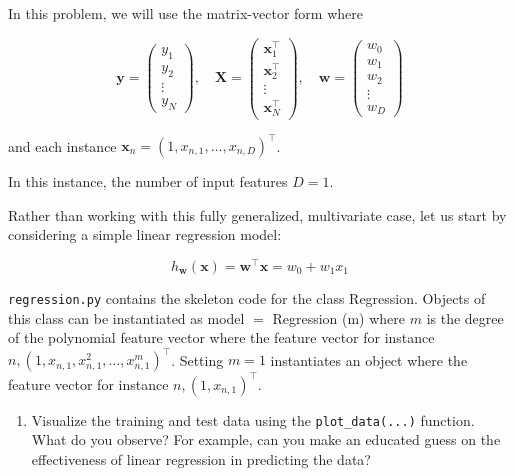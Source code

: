 \documentclass[letterpaper]{article}
\theoremstyle{definition}
\begin{document}
\begin{enumerate}
In this problem, we will use the matrix-vector form where

$$
   \mathbf{y}=\left(\begin{array}{c}
   y_{1} \\
   y_{2} \\
   \vdots \\
   y_{N}
   \end{array}\right), \quad \boldsymbol{X}=\left(\begin{array}{c}
   \mathbf{x}_{1}^{\top} \\
   \mathbf{x}_{2}^{\top} \\
   \vdots \\
   \mathbf{x}_{N}^{\top}
   \end{array}\right), \quad \mathbf{w}=\left(\begin{array}{c}
   w_{0} \\
   w_{1} \\
   w_{2} \\
   \vdots \\
   w_{D}
   \end{array}\right)
   $$

and each instance \(\mathbf{x}_{n}=\left(1, x_{n, 1}, \ldots, x_{n, D}\right)^{\top}\).

In this instance, the number of input features \(D=1\).

Rather than working with this fully generalized, multivariate case, let us start by considering a simple linear regression model:

$$h_{\mathbf{w}}(\mathbf{x})=\mathbf{w}^{\top} \mathbf{x}=w_{0}+w_{1} x_{1}$$

\texttt{regression.py} contains the skeleton code for the class Regression.
Objects of this class can be instantiated as model \(=\) Regression (m)
where \(m\) is the degree of the polynomial feature vector where the feature vector for instance
\(n,\left(1, x_{n, 1}, x_{n, 1}^{2}, \ldots, x_{n, 1}^{m}\right)^{\top}\). Setting \(m=1\)
instantiates an object where the feature vector for instance
\(n,\left(1, x_{n, 1}\right)^{\top}\).

\begin{enumerate}
\item Visualize the training and test data using the \texttt{plot\_data(...)} function.
What do you observe? For example, can you make an educated guess on the effectiveness of
linear regression in predicting the data?


\end{enumerate}
\end{enumerate}
\end{document}

